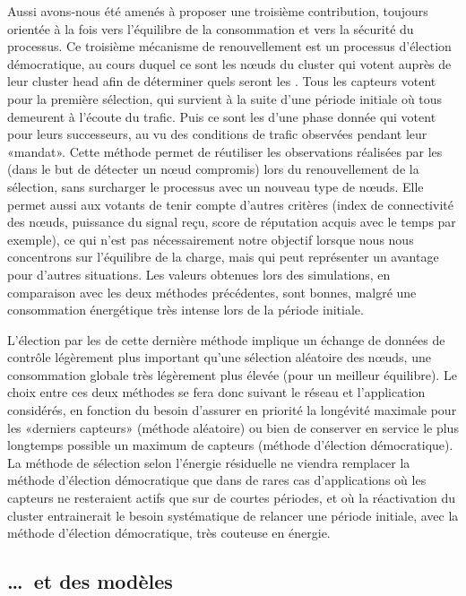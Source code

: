 Aussi avons-nous été amenés à proposer une troisième contribution, toujours orientée à la fois vers l'équilibre de la consommation et vers la sécurité du processus.
Ce troisième mécanisme de renouvellement est un processus d'élection démocratique, au cours duquel ce sont les nœuds du cluster qui votent auprès de leur cluster head afin de déterminer quels seront les \cnst.
Tous les capteurs votent pour la première sélection, qui survient à la suite d'une période initiale où tous demeurent à l'écoute du trafic.
Puis ce sont les \cnst d'une phase donnée qui votent pour leurs successeurs, au vu des conditions de trafic observées pendant leur «mandat».
Cette méthode permet de réutiliser les observations réalisées par les \cnst (dans le but de détecter un nœud compromis) lors du renouvellement de la sélection, sans surcharger le processus avec un nouveau type de nœuds.
Elle permet aussi aux votants de tenir compte d'autres critères (index de connectivité des nœuds, puissance du signal reçu, score de réputation acquis avec le temps par exemple), ce qui n'est pas nécessairement notre objectif lorsque nous nous concentrons sur l'équilibre de la charge, mais qui peut représenter un avantage pour d'autres situations.
Les valeurs obtenues lors des simulations, en comparaison avec les deux méthodes précédentes, sont bonnes, malgré une consommation énergétique très intense lors de la période initiale.

L'élection par les \cnst de cette dernière méthode implique un échange de données de contrôle légèrement plus important qu'une sélection aléatoire des nœuds, \cad une consommation globale très légèrement plus élevée (pour un meilleur équilibre).
Le choix entre ces deux méthodes se fera donc suivant le réseau et l'application considérés, en fonction du besoin d'assurer en priorité la longévité maximale pour les «derniers capteurs» (méthode aléatoire) ou bien de conserver en service le plus longtemps possible un maximum de capteurs (méthode d'élection démocratique).
La méthode de sélection selon l'énergie résiduelle ne viendra remplacer la méthode d'élection démocratique que dans de rares cas d'applications où les capteurs ne resteraient actifs que sur de courtes périodes, et où la réactivation du cluster entrainerait le besoin systématique de relancer une période initiale, avec la méthode d'élection démocratique, très couteuse en énergie.

    \subsection{\dots\ et des modèles}


